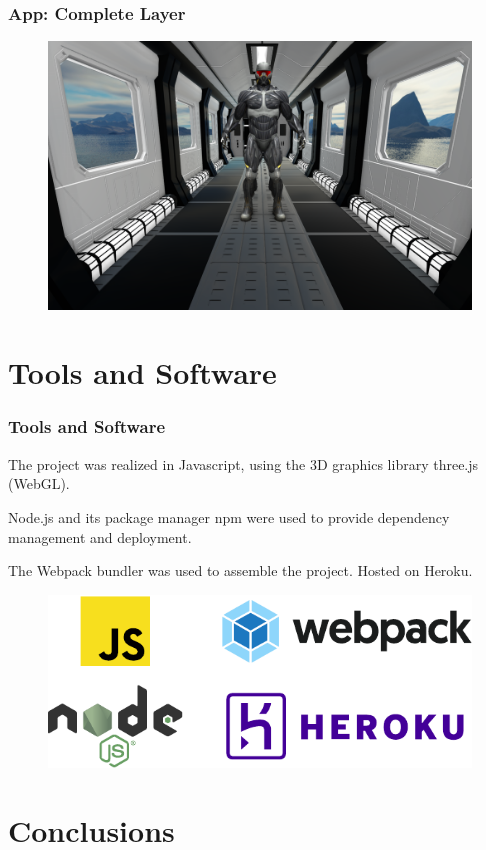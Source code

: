 \documentclass{beamer}
\begin{document}
\begin{frame}
\frametitle{App: Complete Layer}
\begin{figure}
    \centering
    \includegraphics[width=\resultwidth]{images/app_complete}
\end{figure}

\end{frame}

\section{Tools and Software}
\begin{frame}
\frametitle{Tools and Software}
The project was realized in Javascript, using the 3D graphics library three.js (WebGL).

Node.js and its package manager npm were used to provide dependency management and deployment.

The Webpack bundler was used to assemble the project. Hosted on Heroku.
\begin{figure}
    \centering
    \includegraphics[width=0.6\linewidth]{images/software_logos.pdf}
\end{figure}


\end{frame}

\section{Conclusions}
\end{document}
